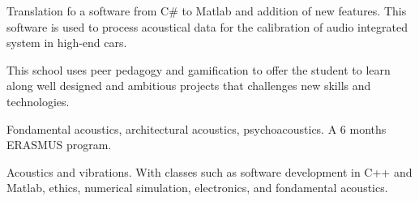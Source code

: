\documentclass[10pt,a4paper]{altacv}
\begin{document}
Translation fo a software from C\# to Matlab and addition of new features. This software is used to process acoustical data for the calibration of audio integrated system in high-end cars.\linebreak

\clearpage


This school uses peer pedagogy and gamification to offer the student to learn along well designed and ambitious projects that challenges new skills and technologies.\linebreak
\divider

Fondamental acoustics, architectural acoustics, psychoacoustics.\linebreak
A 6 months ERASMUS program.\linebreak
\divider

Acoustics and vibrations.\linebreak
With classes such as software development in C++ and Matlab, ethics, numerical simulation, electronics, and fondamental acoustics.
\divider

\clearpage
\end{document}
